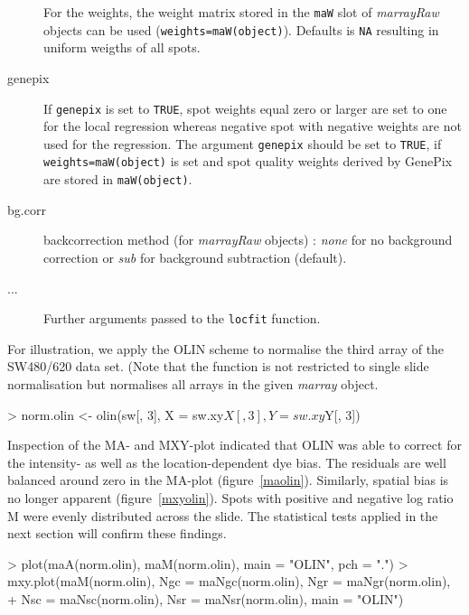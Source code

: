 \documentclass[a4paper,11pt]{article}
\begin{document}
\begin{description}
                          For the weights, the weight matrix stored 
                          in the \texttt{maW} slot of  \emph{marrayRaw} objects can be used 
                           (\texttt{weights=maW(object)}). Defaults is \texttt{NA} resulting
                          in uniform weigths of all spots. 
	\item[genepix]{If \texttt{genepix} is set to 
			\texttt{TRUE},  spot weights equal zero or larger are set
			to one for the local regression whereas negative
			spot with negative weights are not used   for the
			regression. The argument \texttt{genepix} should
			be set to \texttt{TRUE}, if
			\texttt{weights=maW(object)} is set and  spot
			quality weights derived by GenePix are stored in
			\texttt{maW(object)}.}
            \item[bg.corr] backcorrection method (for \emph{marrayRaw} objects)  :
			\emph{none} for no background correction or \emph{sub} 
                          for background subtraction (default).

          \item[...] Further arguments passed to the  \texttt{locfit} function.	
      \end{description}


For illustration, we apply the OLIN scheme to normalise the third array of the SW480/620 data set. 
(Note that the function is not restricted to single slide normalisation but normalises all arrays
in the given \emph{marray} object.

\begin{Schunk}
\begin{Sinput}
> norm.olin <- olin(sw[, 3], X = sw.xy$X[, 3], Y = sw.xy$Y[, 3])
\end{Sinput}
\end{Schunk}

Inspection of the MA- and MXY-plot indicated that OLIN  was able to correct for the  
intensity- as well as  the  location-dependent dye bias. The
 residuals are well  balanced around zero in the MA-plot (figure~\ref{maolin}).
Similarly, spatial bias is no longer apparent (figure~\ref{mxyolin}).
Spots with positive and negative log ratio M were evenly distributed across the slide. 
The statistical tests
applied in the next section will confirm  these findings. 

\begin{Schunk}
\begin{Sinput}
> plot(maA(norm.olin), maM(norm.olin), main = "OLIN", pch = ".")
> mxy.plot(maM(norm.olin), Ngc = maNgc(norm.olin), Ngr = maNgr(norm.olin), 
+     Nsc = maNsc(norm.olin), Nsr = maNsr(norm.olin), main = "OLIN")
\end{Sinput}
\end{Schunk}
\end{document}
